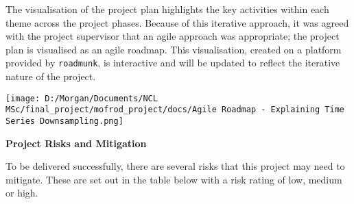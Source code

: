 \documentclass[
]{article}
\begin{document}
The visualisation of the project plan highlights the key activities
within each theme across the project phases. Because of this iterative
approach, it was agreed with the project supervisor that an agile
approach was appropriate; the project plan is visualised as an agile
roadmap. This visualisation, created on a platform provided by
\texttt{roadmunk}, is interactive and will be updated to reflect the
iterative nature of the project.

\texttt{[image: D:/Morgan/Documents/NCL MSc/final\_project/mofrod\_project/docs/Agile Roadmap - Explaining Time Series Downsampling.png]}

\newpage

\textbf{Project Risks and Mitigation}

To be delivered successfully, there are several risks that this project
may need to mitigate. These are set out in the table below with a risk
rating of low, medium or high.
\end{document}

